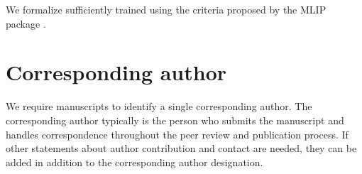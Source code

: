 \documentclass[9pt,twocolumn,twoside]{opticajnl}
\begin{document}
  We formalize \textit{}{sufficiently trained} using the criteria proposed by the MLIP package \cite{mlip}.





\section{Corresponding author}

We require manuscripts to identify a single corresponding author. The corresponding author typically is the person who submits the manuscript and handles correspondence throughout the peer review and publication process. If other statements about author contribution and contact are needed, they can be added in addition to the corresponding author designation.








\end{document}
